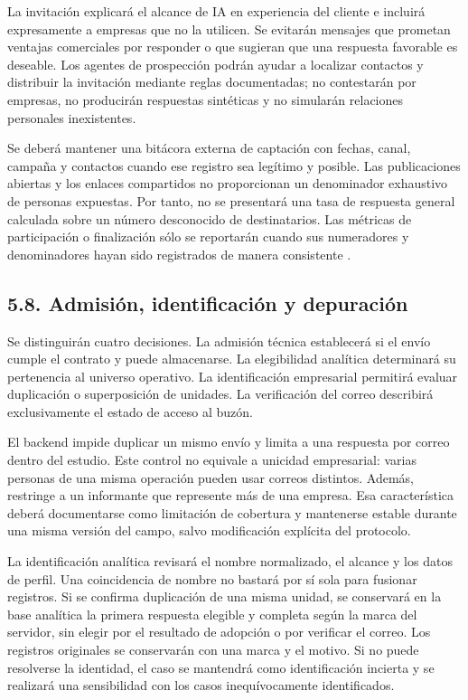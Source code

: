 \documentclass[12pt,letterpaper]{article}
\begin{document}
La invitación explicará el alcance de IA en experiencia del cliente e incluirá expresamente a empresas que no la utilicen. Se evitarán mensajes que prometan ventajas comerciales por responder o que sugieran que una respuesta favorable es deseable. Los agentes de prospección podrán ayudar a localizar contactos y distribuir la invitación mediante reglas documentadas; no contestarán por empresas, no producirán respuestas sintéticas y no simularán relaciones personales inexistentes.

Se deberá mantener una bitácora externa de captación con fechas, canal, campaña y contactos cuando ese registro sea legítimo y posible. Las publicaciones abiertas y los enlaces compartidos no proporcionan un denominador exhaustivo de personas expuestas. Por tanto, no se presentará una tasa de respuesta general calculada sobre un número desconocido de destinatarios. Las métricas de participación o finalización sólo se reportarán cuando sus numeradores y denominadores hayan sido registrados de manera consistente \citep{eysenbach}.

\subsection*{5.8. Admisión, identificación y depuración}
Se distinguirán cuatro decisiones. La admisión técnica establecerá si el envío cumple el contrato y puede almacenarse. La elegibilidad analítica determinará su pertenencia al universo operativo. La identificación empresarial permitirá evaluar duplicación o superposición de unidades. La verificación del correo describirá exclusivamente el estado de acceso al buzón.

El backend impide duplicar un mismo envío y limita a una respuesta por correo dentro del estudio. Este control no equivale a unicidad empresarial: varias personas de una misma operación pueden usar correos distintos. Además, restringe a un informante que represente más de una empresa. Esa característica deberá documentarse como limitación de cobertura y mantenerse estable durante una misma versión del campo, salvo modificación explícita del protocolo.

La identificación analítica revisará el nombre normalizado, el alcance y los datos de perfil. Una coincidencia de nombre no bastará por sí sola para fusionar registros. Si se confirma duplicación de una misma unidad, se conservará en la base analítica la primera respuesta elegible y completa según la marca del servidor, sin elegir por el resultado de adopción o por verificar el correo. Los registros originales se conservarán con una marca y el motivo. Si no puede resolverse la identidad, el caso se mantendrá como identificación incierta y se realizará una sensibilidad con los casos inequívocamente identificados.
\end{document}
